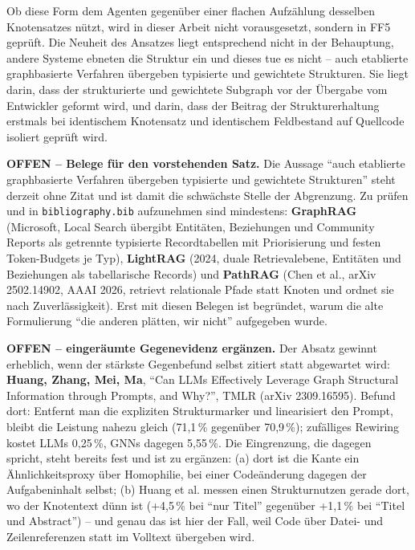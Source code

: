 Ob diese Form dem Agenten gegenüber einer flachen Aufzählung desselben Knotensatzes nützt, wird in dieser Arbeit nicht vorausgesetzt, sondern in FF5 geprüft. Die Neuheit des Ansatzes liegt entsprechend nicht in der Behauptung, andere Systeme ebneten die Struktur ein und dieses tue es nicht -- auch etablierte graphbasierte Verfahren übergeben typisierte und gewichtete Strukturen. Sie liegt darin, dass der strukturierte und gewichtete Subgraph vor der Übergabe vom Entwickler geformt wird, und darin, dass der Beitrag der Strukturerhaltung erstmals bei identischem Knotensatz und identischem Feldbestand auf Quellcode isoliert geprüft wird.

\begin{offen}
\textbf{OFFEN -- Belege für den vorstehenden Satz.} Die Aussage \enquote{auch etablierte graphbasierte Verfahren übergeben typisierte und gewichtete Strukturen} steht derzeit ohne Zitat und ist damit die schwächste Stelle der Abgrenzung. Zu prüfen und in \texttt{bibliography.bib} aufzunehmen sind mindestens: \textbf{GraphRAG} (Microsoft, Local Search übergibt Entitäten, Beziehungen und Community Reports als getrennte typisierte Recordtabellen mit Priorisierung und festen Token-Budgets je Typ), \textbf{LightRAG} (2024, duale Retrievalebene, Entitäten und Beziehungen als tabellarische Records) und \textbf{PathRAG} (Chen et al., arXiv 2502.14902, AAAI 2026, retrievt relationale Pfade statt Knoten und ordnet sie nach Zuverlässigkeit). Erst mit diesen Belegen ist begründet, warum die alte Formulierung \enquote{die anderen plätten, wir nicht} aufgegeben wurde.

\textbf{OFFEN -- eingeräumte Gegenevidenz ergänzen.} Der Absatz gewinnt erheblich, wenn der stärkste Gegenbefund selbst zitiert statt abgewartet wird: \textbf{Huang, Zhang, Mei, Ma}, \enquote{Can LLMs Effectively Leverage Graph Structural Information through Prompts, and Why?}, TMLR (arXiv 2309.16595). Befund dort: Entfernt man die expliziten Strukturmarker und linearisiert den Prompt, bleibt die Leistung nahezu gleich (71,1\,\% gegenüber 70,9\,\%); zufälliges Rewiring kostet LLMs 0,25\,\%, GNNs dagegen 5,55\,\%. Die Eingrenzung, die dagegen spricht, steht bereits fest und ist zu ergänzen: (a) dort ist die Kante ein Ähnlichkeitsproxy über Homophilie, bei einer Codeänderung dagegen der Aufgabeninhalt selbst; (b) Huang et al. messen einen Strukturnutzen gerade dort, wo der Knotentext dünn ist (+4,5\,\% bei \enquote{nur Titel} gegenüber +1,1\,\% bei \enquote{Titel und Abstract}) -- und genau das ist hier der Fall, weil Code über Datei- und Zeilenreferenzen statt im Volltext übergeben wird.
\end{offen}

